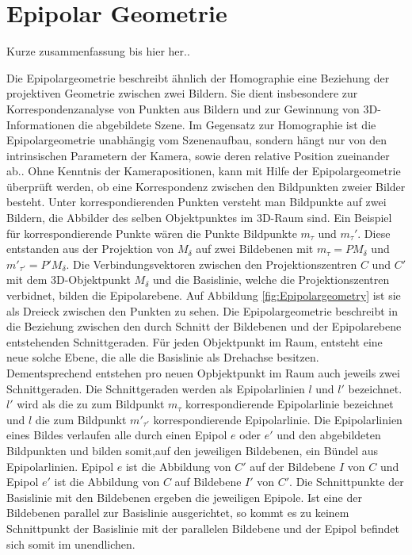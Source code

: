 \section{Epipolar Geometrie}
\label{sec:epipolar} 

Kurze zusammenfassung bis hier her..

Die Epipolargeometrie beschreibt ähnlich der Homographie eine Beziehung der projektiven Geometrie zwischen zwei Bildern\cite{HZ}. Sie dient insbesondere zur Korrespondenzanalyse von Punkten aus Bildern und zur Gewinnung von 3D-Informationen die abgebildete Szene. Im Gegensatz zur Homographie ist die Epipolargeometrie unabhängig vom Szenenaufbau, sondern hängt nur von den intrinsischen Parametern der Kamera, sowie deren relative Position zueinander ab.\cite{HZ}. Ohne Kenntnis der Kamerapositionen, kann mit Hilfe der Epipolargeometrie überprüft werden, ob eine Korrespondenz zwischen den Bildpunkten zweier Bilder besteht. Unter korrespondierenden Punkten versteht man Bildpunkte auf zwei Bildern, die Abbilder des selben Objektpunktes im 3D-Raum sind. Ein Beispiel für korrespondierende Punkte wären die Punkte Bildpunkte $m_\tau$ und $m_\tau'$. Diese entstanden aus der Projektion von $M_\delta$ auf zwei Bildebenen mit $m_\tau = PM_\delta$ und $m'_{\tau'} = P'M_\delta$. Die Verbindungsvektoren zwischen den Projektionszentren $C$ und $C'$ mit dem 3D-Objektpunkt $M_\delta$ und die Basislinie, welche die Projektionszentren verbidnet, bilden die Epipolarebene. Auf Abbildung \ref{fig:Epipolargeometry} ist sie als Dreieck zwischen den Punkten zu sehen. Die Epipolargeometrie beschreibt in die Beziehung zwischen den durch Schnitt der Bildebenen und der Epipolarebene entstehenden Schnittgeraden. Für jeden Objektpunkt im Raum, entsteht eine neue solche Ebene, die alle die Basislinie als Drehachse besitzen\cite{HZ}. Dementsprechend entstehen pro neuen Opbjektpunkt im Raum auch jeweils zwei Schnittgeraden. Die Schnittgeraden werden als Epipolarlinien $l$ und $l'$ bezeichnet. $l'$ wird als die zu zum Bildpunkt $m_\tau$ korrespondierende Epipolarlinie bezeichnet und $l$ die zum Bildpunkt $m'_{\tau'}$ korrespondierende Epipolarlinie.  Die Epipolarlinien eines Bildes verlaufen alle durch einen Epipol $e$ oder $e'$ und den abgebildeten Bildpunkten und bilden somit,auf den jeweiligen Bildebenen, ein Bündel aus Epipolarlinien. Epipol $e$ ist die Abbildung von $C'$ auf der Bildebene $I$ von $C$ und Epipol $e'$ ist die Abbildung von $C$ auf Bildebene $I'$ von $C'$. Die Schnittpunkte der Basislinie mit den Bildebenen ergeben die jeweiligen Epipole. Ist eine der Bildebenen parallel zur Basislinie ausgerichtet, so kommt es zu keinem Schnittpunkt der Basislinie mit der parallelen Bildebene und der Epipol befindet sich somit im unendlichen\cite{HZ,ZZGXr}.

